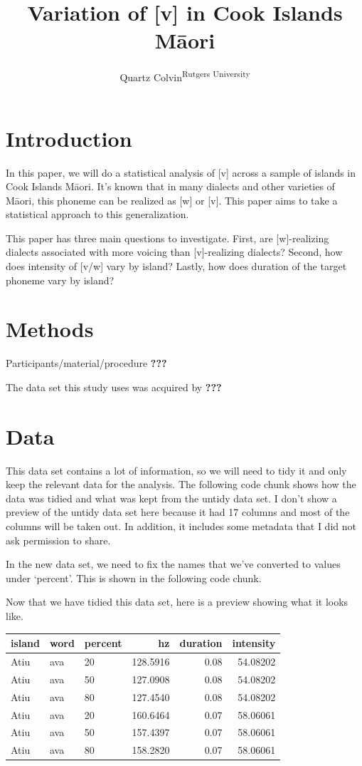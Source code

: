 \documentclass[
  ,man]{apa6}
\title{Variation of {[}v{]} in Cook Islands Māori}
\author{Quartz Colvin\textsuperscript{Rutgers University}}
\date{}
\affiliation{\vspace{0.5cm}\textsuperscript{1} Rutgers University}
\begin{document}
\maketitle

\section{Introduction}\label{introduction}

In this paper, we will do a statistical analysis of {[}v{]} across a sample of islands in Cook Islands Māori. It's known that in many dialects and other varieties of Māori, this phoneme can be realized as {[}w{]} or {[}v{]}. This paper aims to take a statistical approach to this generalization.

This paper has three main questions to investigate. First, are {[}w{]}-realizing dialects associated with more voicing than {[}v{]}-realizing dialects? Second, how does intensity of {[}v/w{]} vary by island? Lastly, how does duration of the target phoneme vary by island?

\section{Methods}\label{methods}

Participants/material/procedure \textbf{???}

The data set this study uses was acquired by \textbf{???}

\section{Data}\label{data}

This data set contains a lot of information, so we will need to tidy it and only keep the relevant data for the analysis. The following code chunk shows how the data was tidied and what was kept from the untidy data set. I don't show a preview of the untidy data set here because it had 17 columns and most of the columns will be taken out. In addition, it includes some metadata that I did not ask permission to share.

In the new data set, we need to fix the names that we've converted to values under `percent'. This is shown in the following code chunk.

Now that we have tidied this data set, here is a preview showing what it looks like.

\begin{tabular}{l|l|l|r|r|r}
\hline
island & word & percent & hz & duration & intensity\\
\hline
Atiu & ava & 20 & 128.5916 & 0.08 & 54.08202\\
\hline
Atiu & ava & 50 & 127.0908 & 0.08 & 54.08202\\
\hline
Atiu & ava & 80 & 127.4540 & 0.08 & 54.08202\\
\hline
Atiu & ava & 20 & 160.6464 & 0.07 & 58.06061\\
\hline
Atiu & ava & 50 & 157.4397 & 0.07 & 58.06061\\
\hline
Atiu & ava & 80 & 158.2820 & 0.07 & 58.06061\\
\hline
\end{tabular}
\end{document}
